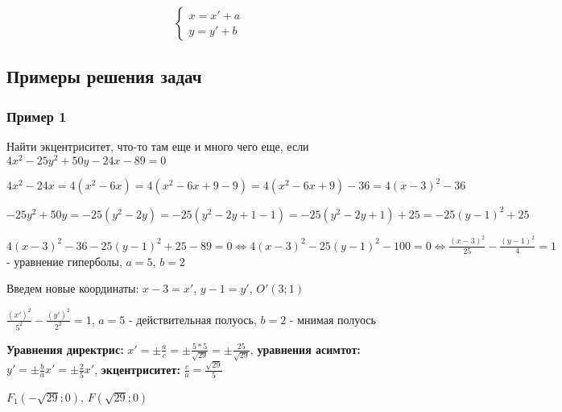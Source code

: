 \documentclass{article}
\begin{document}
\begin{equation}
    \begin{cases}
        x = x' + a \\
        y = y' + b
    \end{cases}
\end{equation}

\subsection{Примеры решения задач}

\subsubsection{Пример 1}

\begin{flushleft}

Найти экцентриситет, что-то там еще и много чего еще, если $4x^2 - 25y^2 + 50y - 24x - 89 = 0$

\hfill

$4x^2 - 24x = 4(x^2 - 6x) = 4 (x^2 - 6x + 9 - 9) = 4 (x^2 - 6x + 9) - 36 = 4 (x - 3)^2 - 36$

$-25y^2 + 50y = -25 (y^2 - 2y) = -25 (y^2 - 2y + 1 - 1) = -25 (y^2 - 2y + 1) + 25 = -25 (y - 1)^2 + 25$

\hfill

$4 (x - 3)^2 - 36 - 25 (y - 1)^2 + 25 - 89 = 0 \Longleftrightarrow 4 (x - 3)^2 - 25 (y - 1)^2 - 100 = 0 \Longleftrightarrow \frac{(x - 3)^2}{25} - \frac{(y - 1)^2}{4} = 1$ - уравнение гиперболы, $a = 5$, $b = 2$

\hfill

Введем новые координаты: $x - 3 = x'$, $y - 1 = y'$, $O'(3; 1)$

$\frac{(x')^2}{5^2} - \frac{(y')^2}{2^2} = 1$, $a = 5$ - действительная полуось, $b = 2$ - мнимая полуось

\hfill

\textbf{Уравнения директрис:} $x' = \pm \frac{a}{c} = \pm \frac{5 * 5}{\sqrt{29}} = \pm \frac{25}{\sqrt{29}}$, \textbf{уравнения асимтот:} $y' = \pm \frac{b}{a} x' = \pm \frac{2}{5} x'$, \textbf{экцентриситет:} $\frac{c}{a} = \frac{\sqrt{29}}{5}$

$F_1(-\sqrt{29}; 0)$, $F(\sqrt{29}; 0)$

\end{flushleft}
\end{document}
